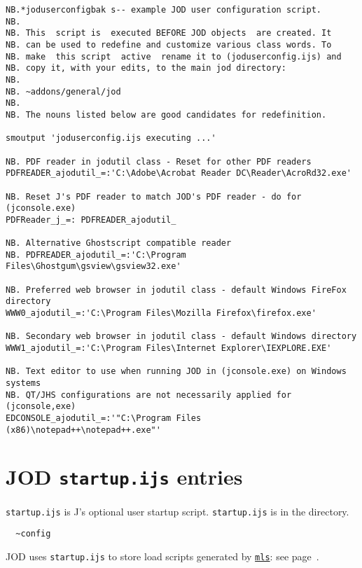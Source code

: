 \begin{lstlisting}[frame=single,framerule=0pt,basicstyle=\ttfamily\footnotesize]  
NB.*joduserconfigbak s-- example JOD user configuration script.
NB.
NB. This  script is  executed BEFORE JOD objects  are created. It
NB. can be used to redefine and customize various class words. To
NB. make  this script  active  rename it to (joduserconfig.ijs) and
NB. copy it, with your edits, to the main jod directory:
NB.
NB. ~addons/general/jod
NB.
NB. The nouns listed below are good candidates for redefinition.

smoutput 'joduserconfig.ijs executing ...'

NB. PDF reader in jodutil class - Reset for other PDF readers
PDFREADER_ajodutil_=:'C:\Adobe\Acrobat Reader DC\Reader\AcroRd32.exe'

NB. Reset J's PDF reader to match JOD's PDF reader - do for (jconsole.exe)
PDFReader_j_=: PDFREADER_ajodutil_

NB. Alternative Ghostscript compatible reader
NB. PDFREADER_ajodutil_=:'C:\Program Files\Ghostgum\gsview\gsview32.exe'

NB. Preferred web browser in jodutil class - default Windows FireFox directory
WWW0_ajodutil_=:'C:\Program Files\Mozilla Firefox\firefox.exe'

NB. Secondary web browser in jodutil class - default Windows directory
WWW1_ajodutil_=:'C:\Program Files\Internet Explorer\IEXPLORE.EXE'

NB. Text editor to use when running JOD in (jconsole.exe) on Windows systems
NB. QT/JHS configurations are not necessarily applied for (jconsole,exe)
EDCONSOLE_ajodutil_=:'"C:\Program Files (x86)\notepad++\notepad++.exe"'
\end{lstlisting}

   
   \newpage
   \section{JOD \texttt{startup.ijs} entries}\label{ap:startup}
   
\verb|startup.ijs| is J's optional user startup 
script. \verb|startup.ijs| is in the directory.
\begin{verbatim}
  ~config   
\end{verbatim}
JOD uses \verb|startup.ijs|
to store load scripts generated by \hyperlink{il:mls}{\texttt{mls}}: see page~\pageref{ss:mls}.
   
